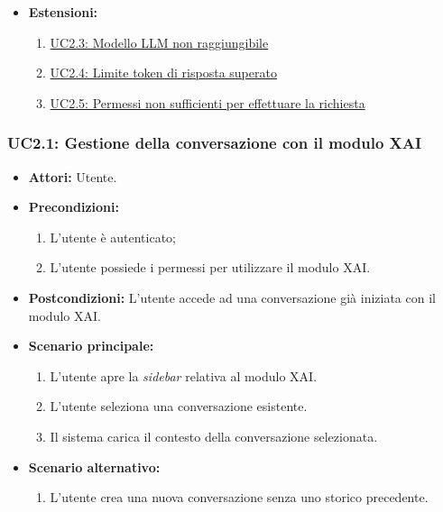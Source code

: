 \begin{itemize}
            \begin{enumerate}
                \item \hyperref[uc:uc2.1]{UC2.1: Gestione della conversazione con il modulo XAI}
                \item \hyperref[uc:uc2.2]{UC2.2: Chiamata a tool per spiegazioni del modulo XAI}
            \end{enumerate}
        \item \textbf{Estensioni:}
            \begin{enumerate}
                \item \hyperref[uc:uc2.3]{UC2.3: Modello LLM non raggiungibile}
                \item \hyperref[uc:uc2.4]{UC2.4: Limite token di risposta superato}
                \item \hyperref[uc:uc2.5]{UC2.5: Permessi non sufficienti per effettuare la richiesta}
            \end{enumerate}
    \end{itemize}

\subsubsection{UC2.1: Gestione della conversazione con il modulo XAI}
\label{uc:uc2.1}
    \begin{itemize}
        \item \textbf{Attori:} Utente.
        \item \textbf{Precondizioni:}
            \begin{enumerate}
                \item L'utente è autenticato;
                \item L'utente possiede i permessi per utilizzare il modulo XAI.
            \end{enumerate}
        \item \textbf{Postcondizioni:} L'utente accede ad una conversazione già iniziata con il modulo XAI.
        \item \textbf{Scenario principale:}
            \begin{enumerate}
                \item L'utente apre la \textit{sidebar} relativa al modulo XAI.
                \item L'utente seleziona una conversazione esistente.
                \item Il sistema carica il contesto della conversazione selezionata.
            \end{enumerate}
        \item \textbf{Scenario alternativo:}
            \begin{enumerate}
                \item L'utente crea una nuova conversazione senza uno storico precedente.
            \end{enumerate}
    \end{itemize}


